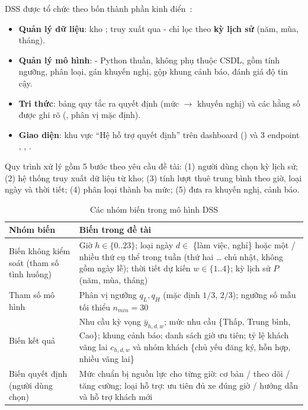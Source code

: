 \label{sec:dss-arch}
DSS được tổ chức theo bốn thành phần kinh điển~\cite{turban}:
\begin{itemize}
    \item \textbf{Quản lý dữ liệu}: kho ; truy xuất qua  - chỉ lọc theo \textbf{kỳ lịch sử} (năm, mùa, tháng).
    \item \textbf{Quản lý mô hình}:  - Python thuần, không phụ thuộc CSDL, gồm tính ngưỡng, phân loại, gán khuyến nghị, gộp khung cảnh báo, đánh giá độ tin cậy.
    \item \textbf{Tri thức}: bảng quy tắc ra quyết định (mức $\rightarrow$ khuyến nghị) và các hằng số được ghi rõ (, phân vị mặc định).
    \item \textbf{Giao diện}: khu vực ``Hệ hỗ trợ quyết định'' trên dashboard () và 3 endpoint , , .
\end{itemize}
Quy trình xử lý gồm 5 bước theo yêu cầu đề tài: (1) người dùng chọn kỳ lịch sử; (2) hệ thống truy xuất dữ liệu từ kho; (3) tính lượt thuê trung bình theo giờ, loại ngày và thời tiết; (4) phân loại thành ba mức; (5) đưa ra khuyến nghị, cảnh báo.

\label{sec:dss-model}
\begin{table}[H]
\centering
\caption{Các nhóm biến trong mô hình DSS}
\label{tab:dss-vars}
\begin{tabularx}{\textwidth}{|p{3.6cm}|X|}
\hline
\textbf{Nhóm biến} & \textbf{Biến trong đề tài} \\ \hline
Biến không kiểm soát (tham số tình huống) & Giờ $h \in \{0..23\}$; loại ngày $d \in$ \{làm việc, nghỉ\} hoặc một / nhiều thứ cụ thể trong tuần (thứ hai \ldots{} chủ nhật, không gồm ngày lễ); thời tiết dự kiến $w \in \{1..4\}$; kỳ lịch sử $P$ (năm, mùa, tháng) \\ \hline
Tham số mô hình & Phân vị ngưỡng $q_L, q_H$ (mặc định $1/3$, $2/3$); ngưỡng số mẫu tối thiểu $n_{min} = 30$ \\ \hline
Biến kết quả & Nhu cầu kỳ vọng $\bar{y}_{h,d,w}$; mức nhu cầu \{Thấp, Trung bình, Cao\}; khung cảnh báo; danh sách giờ ưu tiên; tỷ lệ khách vãng lai $c_{h,d,w}$ và nhóm khách \{chủ yếu đăng ký, hỗn hợp, nhiều vãng lai\} \\ \hline
Biến quyết định (người dùng chọn) & Mức chuẩn bị nguồn lực cho từng giờ: cơ bản / theo dõi / tăng cường; loại hỗ trợ: ưu tiên đủ xe đúng giờ / hướng dẫn và hỗ trợ khách mới \\ \hline
\end{tabularx}
\end{table}

